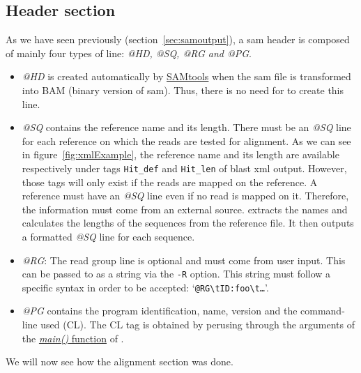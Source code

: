 \subsection{Header section}
\label{subsec:header}
As we have seen previously (section~\ref{sec:samoutput}), a \gls{sam} header is composed of mainly four types of line: \emph{@HD, @SQ, @RG and @PG}.
\begin{itemize}
    \item \emph{@HD} is created automatically by \href{http://www.htslib.org/}{SAMtools} when the \gls{sam} file is transformed into BAM (binary version of \gls{sam}).
    Thus, there is no need for \blastobam{} to create this line.
    \item \emph{@SQ} contains the reference name and its length. There must be an \emph{@SQ} line for each reference on which the reads are tested for alignment.
    As we can see in figure~\ref{fig:xmlExample}, the reference name and its length are available respectively under tags \texttt{Hit\_def} and \texttt{Hit\_len} of \gls{blast} \gls{xml} output.
    However, those tags will only exist if the reads are mapped on the reference.
    A reference must have an \emph{@SQ} line even if no read is mapped on it.
    Therefore, the information must come from an external source.
    \blastobam{} extracts the names and calculates the lengths of the sequences from the reference file.
    It then outputs a formatted \emph{@SQ} line for each sequence.
    \item \emph{@RG}: The read group line is optional and must come from user input.
    This can be passed to \blastobam{} as a string via the \texttt{-R} option.
    This string must follow a specific syntax in order to be accepted: `\texttt{@RG\textbackslash{}tID:foo\textbackslash{}t\ldots}'.
    \item \emph{@PG} contains the program identification, name, version and the command-line used (CL).
    The CL tag is obtained by perusing through the arguments of the \href{https://github.com/guyduche/Blast2Bam/blob/master/src/main.c}{\emph{main()} function} of \blastobam{}.
\end{itemize}
We will now see how the alignment section was done.



